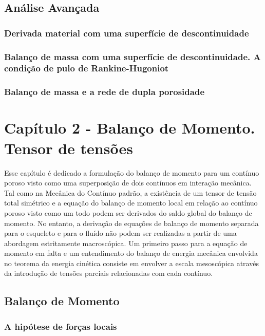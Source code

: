 \documentclass[
	11pt, %
	fleqn, %
	a4paper, %
]{LegrandOrangeBook}
\begin{document}
\section{Análise Avançada}

\subsection{Derivada material com uma superfície de descontinuidade}
\subsection{Balanço de massa com uma superfície de descontinuidade. A condição de pulo de Rankine-Hugoniot}
\subsection{Balanço de massa e a rede de dupla porosidade}


\chapter{Capítulo 2 - Balanço de Momento. Tensor de tensões}

Esse capítulo é dedicado a formulação do balanço de momento para um contínuo poroso visto como uma superposição de dois contínuos em interação mecânica. Tal como na Mecânica do Contínuo padrão, a existência de um tensor de tensão total simétrico e a equação do balanço de momento local em relação ao contínuo poroso visto como um todo podem ser derivados do saldo global do balanço de momento. No entanto, a derivação de equações de balanço de momento separada para o esqueleto e para o fluído não podem ser realizadas a partir de uma abordagem estritamente macroscópica. Um primeiro passo para a equação de momento em falta e um entendimento do balanço de energia mecânica envolvida no teorema da energia cinética consiste em envolver a escala mesoscópica através da introdução de tensões parciais relacionadas com cada contínuo.

\section{Balanço de Momento}

\newcommand{\fl}{\textbf{f}}

\subsection{A hipótese de forças locais}
\end{document}
